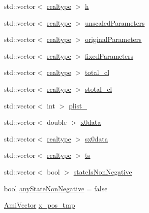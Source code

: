 \begin{DoxyCompactItemize}
\item 
std\+::vector$<$ \mbox{\hyperlink{namespaceamici_a1bdce28051d6a53868f7ccbf5f2c14a3}{realtype}} $>$ \mbox{\hyperlink{classamici_1_1_model_a0e4df9c10406b35bd54f6f839322ca87}{h}}
\item 
std\+::vector$<$ \mbox{\hyperlink{namespaceamici_a1bdce28051d6a53868f7ccbf5f2c14a3}{realtype}} $>$ \mbox{\hyperlink{classamici_1_1_model_a2f57f75ff99d8bfcabb33c8cda86308d}{unscaled\+Parameters}}
\item 
std\+::vector$<$ \mbox{\hyperlink{namespaceamici_a1bdce28051d6a53868f7ccbf5f2c14a3}{realtype}} $>$ \mbox{\hyperlink{classamici_1_1_model_a65d6047f145381b0363ac02feb2433b4}{original\+Parameters}}
\item 
std\+::vector$<$ \mbox{\hyperlink{namespaceamici_a1bdce28051d6a53868f7ccbf5f2c14a3}{realtype}} $>$ \mbox{\hyperlink{classamici_1_1_model_ac1d5115134ec1c839f1e913724ceb2b4}{fixed\+Parameters}}
\item 
std\+::vector$<$ \mbox{\hyperlink{namespaceamici_a1bdce28051d6a53868f7ccbf5f2c14a3}{realtype}} $>$ \mbox{\hyperlink{classamici_1_1_model_a20f20480665b3eea684392186fb87675}{total\+\_\+cl}}
\item 
std\+::vector$<$ \mbox{\hyperlink{namespaceamici_a1bdce28051d6a53868f7ccbf5f2c14a3}{realtype}} $>$ \mbox{\hyperlink{classamici_1_1_model_a103e2e2161a296524543b0bd060fc22a}{stotal\+\_\+cl}}
\item 
std\+::vector$<$ int $>$ \mbox{\hyperlink{classamici_1_1_model_a67919df701b4afd60d13fc890432d9ec}{plist\+\_\+}}
\item 
std\+::vector$<$ double $>$ \mbox{\hyperlink{classamici_1_1_model_ac305126c59aab952182f851679df24f9}{x0data}}
\item 
std\+::vector$<$ \mbox{\hyperlink{namespaceamici_a1bdce28051d6a53868f7ccbf5f2c14a3}{realtype}} $>$ \mbox{\hyperlink{classamici_1_1_model_a7ebdaf00a4177be525b45a39edf1865c}{sx0data}}
\item 
std\+::vector$<$ \mbox{\hyperlink{namespaceamici_a1bdce28051d6a53868f7ccbf5f2c14a3}{realtype}} $>$ \mbox{\hyperlink{classamici_1_1_model_aa7014a80e7b102f85a10e3b9a480e8e5}{ts}}
\item 
std\+::vector$<$ bool $>$ \mbox{\hyperlink{classamici_1_1_model_a30f9edd35aad3ccaba31f67331881da5}{state\+Is\+Non\+Negative}}
\item 
bool \mbox{\hyperlink{classamici_1_1_model_a2b314d4bdf8555d609a69846b4ab0934}{any\+State\+Non\+Negative}} = false
\item 
\mbox{\hyperlink{classamici_1_1_ami_vector}{Ami\+Vector}} \mbox{\hyperlink{classamici_1_1_model_a2dc43104a5b25d9689d827fc51f04346}{x\+\_\+pos\+\_\+tmp}}

\end{DoxyCompactItemize}
